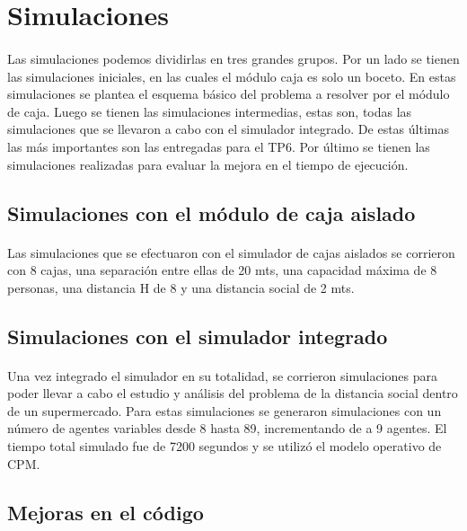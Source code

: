 \documentclass{article}
\begin{document}
\section{Simulaciones}

\paragraph{}
Las simulaciones podemos dividirlas en tres grandes grupos. Por un lado se tienen las simulaciones iniciales, en las cuales el módulo caja es solo un boceto. En estas simulaciones se plantea el esquema básico del problema a resolver por el módulo de caja. Luego se tienen las simulaciones intermedias, estas son, todas las simulaciones que se llevaron a cabo con el simulador integrado. De estas últimas las más importantes son las entregadas para el TP6. Por último se tienen las simulaciones realizadas para evaluar la mejora en el tiempo de ejecución.

\subsection{Simulaciones con el módulo de caja aislado}

\paragraph{}
Las simulaciones que se efectuaron con el simulador de cajas aislados se corrieron con 8 cajas, una separación entre ellas de 20 mts, una capacidad máxima de 8 personas, una distancia H de 8 y una distancia social de 2 mts.

\subsection{Simulaciones con el simulador integrado}

\paragraph{}
Una vez integrado el simulador en su totalidad, se corrieron simulaciones para poder llevar a cabo el estudio y análisis del problema de la distancia social dentro de un supermercado. Para estas simulaciones se generaron simulaciones con un número de agentes variables desde 8 hasta 89, incrementando de a 9 agentes. El tiempo total simulado fue de 7200 segundos y se utilizó el modelo operativo de CPM.

\subsection{Mejoras en el código}
\end{document}
